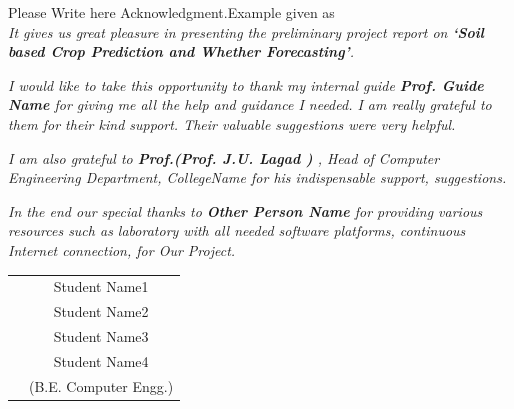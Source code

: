 \documentclass[oneside,a4paper,12pt]{report}
\begin{document}
\newpage

\setcounter{page}{0}
\frontmatter
{}
\rfoot{\thepage}


{   \setlength{\parindent}{11mm} }
{ \setlength{\parindent}{0mm} }
Please Write here Acknowledgment.Example given as\\
\textit{It gives us great pleasure in presenting the preliminary project report 
on {\bfseries \fontsize{12}{12} \selectfont `Soil based Crop Prediction and Whether Forecasting'}.}
\vspace*{1.5\baselineskip}

 \textit{I would like to take this opportunity to thank my internal guide
 \textbf{Prof. Guide Name} for giving me all the help and guidance I needed. I am
 really grateful to them for their kind support. Their valuable suggestions were very helpful.} \vspace*{1.5\baselineskip}

 \textit{I am also grateful to \textbf{Prof.(Prof. J.U. Lagad ) }, Head of Computer
 Engineering Department, CollegeName for his indispensable
 support, suggestions.}
\vspace*{1.5\baselineskip}

\textit{In the end our special thanks to \textbf{Other Person Name} for
providing various resources such as  laboratory with all needed software platforms,
continuous Internet connection, for Our Project.}
\vspace*{3\baselineskip} \\
\begin{tabular}{p{8.2cm}c}
&Student Name1\\
&Student Name2\\
&Student Name3\\
&Student Name4\\
&(B.E. Computer Engg.)
\end{tabular}
\end{document}
